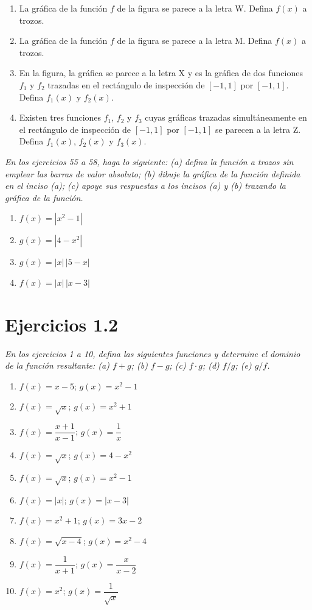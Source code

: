 \documentclass[12pt]{article}
\theoremstyle{remark}
\begin{document}
\begin{enumerate}[start=47]
\item La gráfica de la función $f$ de la figura se parece a la letra W. Defina $f(x)$ a trozos.
\item La gráfica de la función $f$ de la figura se parece a la letra M. Defina $f(x)$ a trozos.
\item En la figura, la gráfica se parece a la letra X y es la gráfica de dos funciones $f_1$ y $f_2$ trazadas en el rectángulo de inspección de $[-1,1]$ por $[-1,1]$. Defina $f_1(x)$ y $f_2(x)$.
\item Existen tres funciones $f_1$, $f_2$ y $f_3$ cuyas gráficas trazadas simultáneamente en el rectángulo de inspección de $[-1,1]$ por $[-1,1]$ se parecen a la letra Z. Defina $f_1(x)$, $f_2(x)$ y $f_3(x)$.
\end{enumerate}

\textit{En los ejercicios 55 a 58, haga lo siguiente: (a) defina la función a trozos sin emplear las barras de valor absoluto; (b) dibuje la gráfica de la función definida en el inciso (a); (c) apoye sus respuestas a los incisos (a) y (b) trazando la gráfica de la función.}

\begin{enumerate}[start=55]
\item $f(x)=|x^2-1|$
\item $g(x)=|4-x^2|$
\item $g(x)=|x|\,|5-x|$
\item $f(x)=|x|\,|x-3|$
\end{enumerate}

\newpage
\section*{Ejercicios 1.2}

\textit{En los ejercicios 1 a 10, defina las siguientes funciones y determine el dominio de la función resultante: (a) $f+g$; (b) $f-g$; (c) $f\cdot g$; (d) $f/g$; (e) $g/f$.}

\begin{enumerate}
\item $f(x)=x-5$; $g(x)=x^2-1$
\item $f(x)=\sqrt{x}$; $g(x)=x^2+1$
\item $f(x)=\dfrac{x+1}{x-1}$; $g(x)=\dfrac1x$
\item $f(x)=\sqrt{x}$; $g(x)=4-x^2$
\item $f(x)=\sqrt{x}$; $g(x)=x^2-1$
\item $f(x)=|x|$; $g(x)=|x-3|$
\item $f(x)=x^2+1$; $g(x)=3x-2$
\item $f(x)=\sqrt{x-4}$; $g(x)=x^2-4$
\item $f(x)=\dfrac1{x+1}$; $g(x)=\dfrac{x}{x-2}$
\item $f(x)=x^2$; $g(x)=\dfrac1{\sqrt{x}}$
\end{enumerate}
\end{document}

